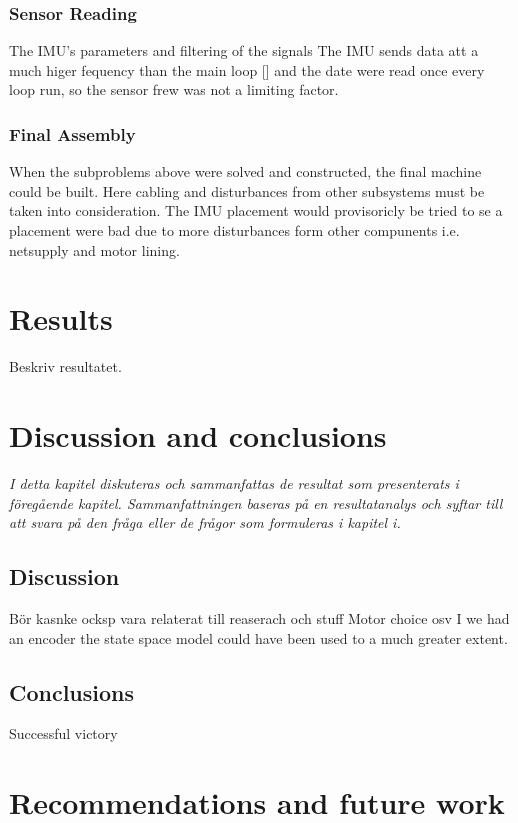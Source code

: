 \documentclass[a4paper,11pt]{kth-mag}
\begin{document}
\subsection{Sensor Reading}
The IMU's parameters and filtering of the signals
The IMU sends data att a much higer fequency than the main loop [] and the date were read once every loop run, so the sensor frew was not a limiting factor.


\subsection{Final Assembly}
When the subproblems above were solved and constructed, the final machine could be built. Here cabling and disturbances from other subsystems must be taken into consideration. 
The IMU placement would provisoricly be tried to se a placement were bad due to more disturbances form other compunents i.e. netsupply and motor lining.





\chapter{Results}
Beskriv resultatet. 

\chapter{Discussion and conclusions}
\emph{I detta kapitel diskuteras och sammanfattas de resultat som presenterats i föregående kapitel. Sammanfattningen baseras på en resultatanalys och syftar till att svara på den fråga eller de frågor som formuleras i kapitel i.}

\section{Discussion}
Bör kasnke ocksp vara relaterat till reaserach och stuff
Motor choice osv
I we had an encoder the state space model could have been used to a much greater extent.

\section{Conclusions}
Successful victory


\chapter{Recommendations and future work}
\end{document}
